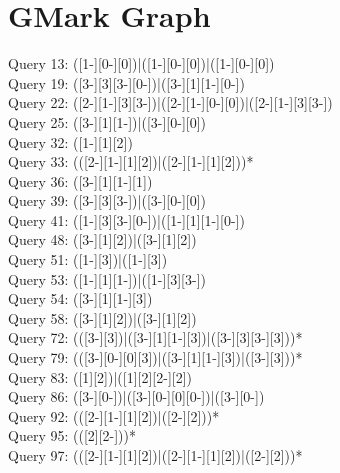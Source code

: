 \section{GMark Graph}
Query 13: ([1-][0-][0])|([1-][0-][0])|([1-][0-][0])
\\Query 19: ([3-][3][3-][0-])|([3-][1][1-][0-])
\\Query 22: ([2-][1-][3][3-])|([2-][1-][0-][0])|([2-][1-][3][3-])
\\Query 25: ([3-][1][1-])|([3-][0-][0])
\\Query 32: ([1-][1][2])
\\Query 33: (([2-][1-][1][2])|([2-][1-][1][2]))*
\\Query 36: ([3-][1][1-][1])
\\Query 39: ([3-][3][3-])|([3-][0-][0])
\\Query 41: ([1-][3][3-][0-])|([1-][1][1-][0-])
\\Query 48: ([3-][1][2])|([3-][1][2])
\\Query 51: ([1-][3])|([1-][3])
\\Query 53: ([1-][1][1-])|([1-][3][3-])
\\Query 54: ([3-][1][1-][3])
\\Query 58: ([3-][1][2])|([3-][1][2])
\\Query 72: (([3-][3])|([3-][1][1-][3])|([3-][3][3-][3]))*
\\Query 79: (([3-][0-][0][3])|([3-][1][1-][3])|([3-][3]))*
\\Query 83: ([1][2])|([1][2][2-][2])
\\Query 86: ([3-][0-])|([3-][0-][0][0-])|([3-][0-])
\\Query 92: (([2-][1-][1][2])|([2-][2]))*
\\Query 95: (([2][2-]))*
\\Query 97: (([2-][1-][1][2])|([2-][1-][1][2])|([2-][2]))*